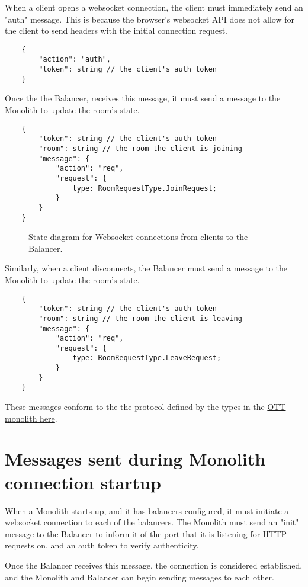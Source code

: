 When a client opens a websocket connection, the client must immediately send an "auth" message. This is because the browser's websocket API does not allow for the client to send headers with the initial connection request.

\begin{verbatim}
	{
		"action": "auth",
		"token": string // the client's auth token
	}
\end{verbatim}

Once the the Balancer, receives this message, it must send a message to the Monolith to update the room's state.

\begin{verbatim}
	{
		"token": string // the client's auth token
		"room": string // the room the client is joining
		"message": {
			"action": "req",
			"request": {
				type: RoomRequestType.JoinRequest;
			}
		}
	}
\end{verbatim}

\begin{figure}[h!]
	\centering
	\caption{State diagram for Websocket connections from clients to the Balancer.}
	\label{fig:client-connection-state}
\end{figure}

Similarly, when a client disconnects, the Balancer must send a message to the Monolith to update the room's state.

\begin{verbatim}
	{
		"token": string // the client's auth token
		"room": string // the room the client is leaving
		"message": {
			"action": "req",
			"request": {
				type: RoomRequestType.LeaveRequest;
			}
		}
	}
\end{verbatim}

These messages conform to the the protocol defined by the types in the \href{https://github.com/dyc3/opentogethertube/blob/master/common/models/messages.ts}{OTT monolith here}.

\section{Messages sent during Monolith connection startup}

When a Monolith starts up, and it has balancers configured, it must initiate a websocket connection to each of the balancers. The Monolith must send an "init" message to the Balancer to inform it of the port that it is listening for HTTP requests on, and an auth token to verify authenticity.

Once the Balancer receives this message, the connection is considered established, and the Monolith and Balancer can begin sending messages to each other.